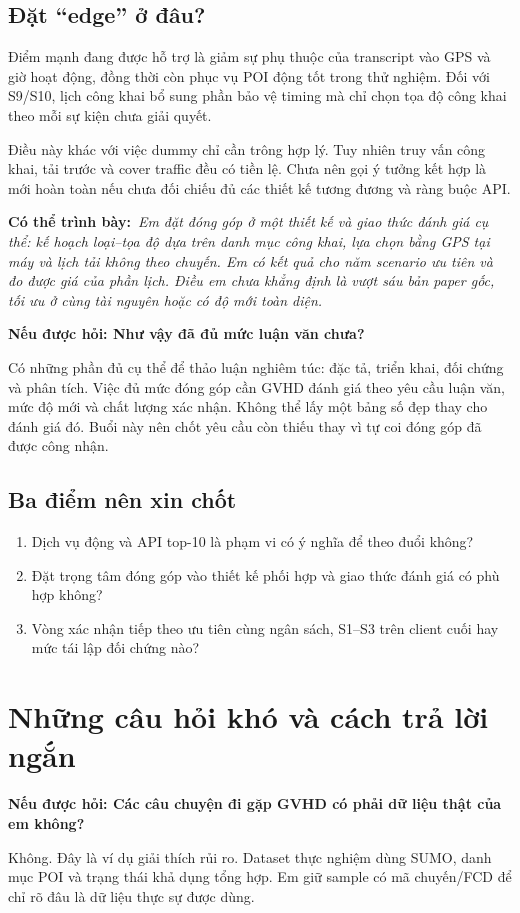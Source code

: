 \documentclass[10pt,a4paper]{article}
\newcommand{\say}[1]{\par\textbf{Có thể trình bày:}\ \textit{#1}\par}
\newcommand{\ask}[2]{\par\textbf{Nếu được hỏi: #1}\par #2\par}
\newcommand{\guidepage}[1]{\clearpage\section{#1}}
\begin{document}
\subsection*{Đặt ``edge'' ở đâu?}
Điểm mạnh đang được hỗ trợ là giảm sự phụ thuộc của transcript vào GPS và giờ hoạt động, đồng thời còn phục vụ POI động tốt trong thử nghiệm. Đối với S9/S10, lịch công khai bổ sung phần bảo vệ timing mà chỉ chọn tọa độ công khai theo mỗi sự kiện chưa giải quyết.

Điều này khác với việc dummy chỉ cần trông hợp lý. Tuy nhiên truy vấn công khai, tải trước và cover traffic đều có tiền lệ. Chưa nên gọi ý tưởng kết hợp là mới hoàn toàn nếu chưa đối chiếu đủ các thiết kế tương đương và ràng buộc API.

\say{Em đặt đóng góp ở một thiết kế và giao thức đánh giá cụ thể: kế hoạch loại--tọa độ dựa trên danh mục công khai, lựa chọn bằng GPS tại máy và lịch tải không theo chuyến. Em có kết quả cho năm scenario ưu tiên và đo được giá của phần lịch. Điều em chưa khẳng định là vượt sáu bản paper gốc, tối ưu ở cùng tài nguyên hoặc có độ mới toàn diện.}

\ask{Như vậy đã đủ mức luận văn chưa?}{Có những phần đủ cụ thể để thảo luận nghiêm túc: đặc tả, triển khai, đối chứng và phân tích. Việc đủ mức đóng góp cần GVHD đánh giá theo yêu cầu luận văn, mức độ mới và chất lượng xác nhận. Không thể lấy một bảng số đẹp thay cho đánh giá đó. Buổi này nên chốt yêu cầu còn thiếu thay vì tự coi đóng góp đã được công nhận.}

\subsection*{Ba điểm nên xin chốt}
\begin{enumerate}
\item Dịch vụ động và API top-10 là phạm vi có ý nghĩa để theo đuổi không?
\item Đặt trọng tâm đóng góp vào thiết kế phối hợp và giao thức đánh giá có phù hợp không?
\item Vòng xác nhận tiếp theo ưu tiên cùng ngân sách, S1--S3 trên client cuối hay mức tái lập đối chứng nào?
\end{enumerate}

\guidepage{Những câu hỏi khó và cách trả lời ngắn}
\ask{Các câu chuyện đi gặp GVHD có phải dữ liệu thật của em không?}{Không. Đây là ví dụ giải thích rủi ro. Dataset thực nghiệm dùng SUMO, danh mục POI và trạng thái khả dụng tổng hợp. Em giữ sample có mã chuyến/FCD để chỉ rõ đâu là dữ liệu thực sự được dùng.}
\end{document}
